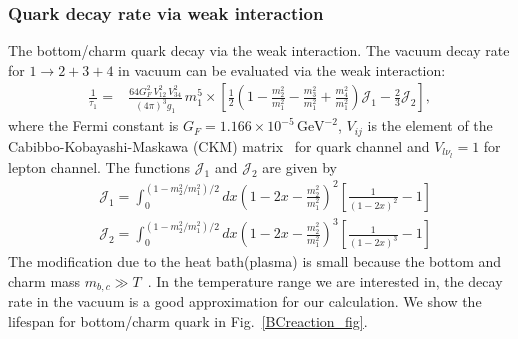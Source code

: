 \subsubsection{Quark decay rate via weak interaction}
The bottom/charm quark decay via the weak interaction.
The vacuum decay rate for $1\to2+3+4$ in vacuum can be evaluated via the weak interaction:
\begin{align}
\frac{1}{\tau_1}=&\frac{64G^2_F\,V^2_{12}\,V^2_{34}}{(4\pi)^3g_1}\,m^5_1\times\left[\frac{1}{2}{\left(1-\frac{m^2_2}{m^2_1}-\frac{m^2_3}{m^2_1}+\frac{m^2_4}{m^2_1}\right)}\mathcal{J}_1-\frac{2}{3}\mathcal{J}_2\right],
\end{align}
where the Fermi constant is $G_F=1.166\times10^{-5}\,\mathrm{GeV}^{-2}$, $V_{ij}$ is the element of the Cabibbo-Kobayashi-Maskawa (CKM) matrix~\cite{Czarnecki:2004cw} for quark channel and $V_{l\nu_l}=1$ for lepton channel. The functions $\mathcal{J}_1$ and $\mathcal{J}_2$ are given by
\begin{align}
&\mathcal{J}_1\!=\!\!\!\int_0^{(1-m^2_2/m^2_1)/2}\!\!\!\!\!\!\!\!dx\left(1\!-\!2x\!-\!\frac{m^2_2}{m_1^2}\right)^{\!\!2}\left[\frac{1}{(1-2x)^2}-1\right]\\
&\mathcal{J}_2\!=\!\!\!\int_0^{(1-m^2_2/m^2_1)/2}\!\!\!\!\!\!\!\!dx\left(1\!-\!2x\!-\!\frac{m^2_2}{m_1^2}\right)^{\!\!3}\left[\frac{1}{(1-2x)^3}-1\right]
\end{align}
The modification due to the heat bath(plasma) is small because the bottom and charm  mass $m_{b,c}\gg T$~\cite{Kuznetsova:2008jt}. In the temperature range we are interested in, the decay rate in the vacuum is a good approximation for our calculation. We show the lifespan for bottom/charm quark in Fig.~\ref{BCreaction_fig}. 




